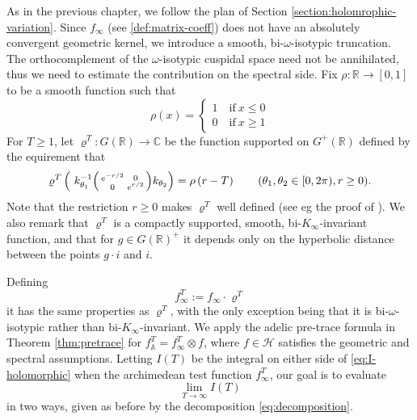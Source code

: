 \documentclass{article}
\numberwithin{equation}{section}
\begin{document}
As in the previous chapter, we follow the plan of Section \ref{section:holomrophic-variation}. Since $f_\infty$ (see \eqref{def:matrix-coeff}) does not have an absolutely convergent geometric kernel, we introduce a smooth, bi-$\omega$-isotypic truncation. The orthocomplement of the $\omega$-isotypic cuspidal space need not be annihilated, thus we need to estimate the contribution on the spectral side.
Fix $\rho: \mathbb{R} \to [0,1]$ to be a smooth function such that
\begin{equation}
    \rho(x)=\begin{cases}
    1 \quad \text{if} \ x\leq 0 \\
    0 \quad \text{if} \ x\geq 1
\end{cases}
\end{equation}
For $T\geq 1$, let $\varrho^T: G(\mathbb{R}) \to \mathbb{C}$ be the function supported on $G^+(\mathbb{R})$ defined by the equirement that
\begin{equation}\label{eq:smooth-truncation}
    \varrho^T\left(\ k_{\theta_1}^{-1}\begin{psmallmatrix}
    e^{-r/2} & 0 \\ 0 & e^{r/2}
\end{psmallmatrix} k_{\theta_2} \right)=\rho\left(r-T\right) \qquad (\theta_1,\theta_2 \in [0,2\pi), r\geq 0).
\end{equation}
Note that the restriction $r\geq 0$ makes $\varrho^T$ well defined (see eg the proof of \cite[Proposition 6.13]{Traces}). We also remark that $\varrho^T$ is a compactly supported, smooth, bi-$K_\infty$-invariant function, and that for $g \in G(\mathbb{R})^+$ it depends only on the hyperbolic distance between the points $g\cdot i$ and $i$. 


Defining 
\begin{equation}\label{def:truncated-test-function}
    f_\infty^T:=f_\infty \cdot \varrho^T
\end{equation}
it has the same properties as $\varrho^T$, with the only exception being that it is bi-$\omega$-isotypic rather than bi-$K_\infty$-invariant. We apply the adelic pre-trace formula in Theorem \ref{thm:pretrace} for $f_\mathbb{A}^T=f_\infty^T \otimes f$, where $f \in \mathcal{H}$ satisfies the geometric and spectral assumptions. Letting $I(T)$ be the integral on either side of \eqref{eq:I-holomorphic} when the archimedean test function $f_\infty^T$, our goal is to evaluate 
\begin{equation*}
    \lim_{T \to \infty} I(T)
\end{equation*}
in two ways, given as before by the decomposition \eqref{eq:decomposition}.
\end{document}
